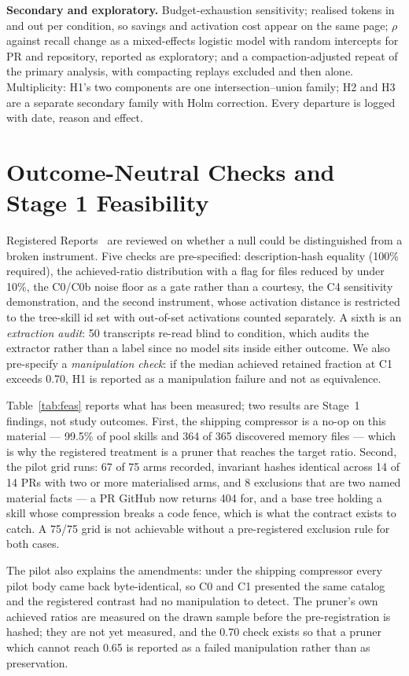 \documentclass[10pt,conference]{IEEEtran}
\begin{document}
\textbf{Secondary and exploratory.} Budget-exhaustion sensitivity; realised tokens in and out per condition, so savings and activation cost appear on the same page; $\rho$ against recall change as a mixed-effects logistic model with random intercepts for PR and repository, reported as exploratory; and a compaction-adjusted repeat of the primary analysis, with compacting replays excluded and then alone. Multiplicity: H1's two components are one intersection--union family; H2 and H3 are a separate secondary family with Holm correction. Every departure is logged with date, reason and effect.

\section{Outcome-Neutral Checks and Stage 1 Feasibility}
\label{sec:feas}
Registered Reports~\cite{ernst} are reviewed on whether a null could be distinguished from a broken instrument. Five checks are pre-specified: description-hash equality (100\% required), the achieved-ratio distribution with a flag for files reduced by under 10\%, the C0/C0b noise floor as a gate rather than a courtesy, the C4 sensitivity demonstration, and the second instrument, whose activation distance is restricted to the tree-skill id set with out-of-set activations counted separately. A sixth is an \emph{extraction audit}: 50 transcripts re-read blind to condition, which audits the extractor rather than a label since no model sits inside either outcome. We also pre-specify a \emph{manipulation check}: if the median achieved retained fraction at C1 exceeds 0.70, H1 is reported as a manipulation failure and not as equivalence.

Table~\ref{tab:feas} reports what has been measured; two results are Stage~1 findings, not study outcomes. First, the shipping compressor is a no-op on this material --- 99.5\% of pool skills and 364 of 365 discovered memory files --- which is why the registered treatment is a pruner that reaches the target ratio. Second, the pilot grid runs: 67 of 75 arms recorded, invariant hashes identical across 14 of 14 PRs with two or more materialised arms, and 8 exclusions that are two named material facts --- a PR GitHub now returns 404 for, and a base tree holding a skill whose compression breaks a code fence, which is what the contract exists to catch. A 75/75 grid is not achievable without a pre-registered exclusion rule for both cases.

The pilot also explains the amendments: under the shipping compressor every pilot body came back byte-identical, so C0 and C1 presented the same catalog and the registered contrast had no manipulation to detect. The pruner's own achieved ratios are measured on the drawn sample before the pre-registration is hashed; they are not yet measured, and the 0.70 check exists so that a pruner which cannot reach 0.65 is reported as a failed manipulation rather than as preservation.
\end{document}

